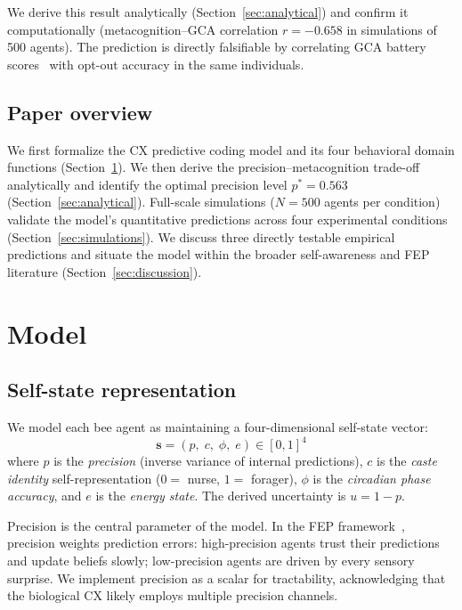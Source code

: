 \documentclass[12pt]{article}
\newcommand{\precision}{p}
\newcommand{\uncertainty}{u}
\newcommand{\pstar}{p^*}
\begin{document}
We derive this result analytically (Section~\ref{sec:analytical}) and confirm it computationally
(metacognition--GCA correlation $r = -0.658$ in simulations of 500 agents). The prediction is
directly falsifiable by correlating GCA battery scores~\cite{AnimalCog2024} with opt-out
accuracy in the same individuals.

\subsection*{Paper overview}

We first formalize the CX predictive coding model and its four behavioral domain functions
(Section~\ref{sec:model}). We then derive the precision--metacognition trade-off analytically and
identify the optimal precision level $\pstar = 0.563$ (Section~\ref{sec:analytical}). Full-scale
simulations ($N = 500$ agents per condition) validate the model's quantitative predictions across
four experimental conditions (Section~\ref{sec:simulations}). We discuss three directly testable
empirical predictions and situate the model within the broader self-awareness and FEP literature
(Section~\ref{sec:discussion}).

\section{Model}
\label{sec:model}

\subsection*{Self-state representation}

We model each bee agent as maintaining a four-dimensional self-state vector:
\begin{equation}
  \mathbf{s} = (\precision,\; c,\; \phi,\; e) \in [0,1]^4
\end{equation}
where $\precision$ is the \emph{precision} (inverse variance of internal predictions), $c$ is the
\emph{caste identity} self-representation ($0 =$ nurse, $1 =$ forager), $\phi$ is the
\emph{circadian phase accuracy}, and $e$ is the \emph{energy state}. The derived uncertainty is
$\uncertainty = 1 - \precision$.

Precision is the central parameter of the model. In the FEP framework~\cite{Friston2010},
precision weights prediction errors: high-precision agents trust their predictions and update
beliefs slowly; low-precision agents are driven by every sensory surprise. We implement precision
as a scalar for tractability, acknowledging that the biological CX likely employs multiple
precision channels.
\end{document}
